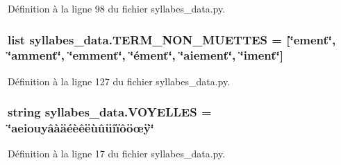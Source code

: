 Définition à la ligne 98 du fichier syllabes\+\_\+data.\+py.

\hypertarget{namespacesyllabes__data_a0f5eea94775ebc51b2af4d9be6cbd1c7}{}
\subsubsection[{T\+E\+R\+M\+\_\+\+N\+O\+N\+\_\+\+M\+U\+E\+T\+T\+E\+S}]{\setlength{\rightskip}{0pt plus 5cm}list syllabes\+\_\+data.\+T\+E\+R\+M\+\_\+\+N\+O\+N\+\_\+\+M\+U\+E\+T\+T\+E\+S = \mbox{[}\char`\"{}ement\char`\"{}, \char`\"{}amment\char`\"{}, \char`\"{}emment\char`\"{}, \char`\"{}ément\char`\"{}, \char`\"{}aiement\char`\"{}, \char`\"{}iment\char`\"{}\mbox{]}}\label{namespacesyllabes__data_a0f5eea94775ebc51b2af4d9be6cbd1c7}


Définition à la ligne 127 du fichier syllabes\+\_\+data.\+py.

\hypertarget{namespacesyllabes__data_a45d6f7f31ae2938971bb79a293ded927}{}
\subsubsection[{V\+O\+Y\+E\+L\+L\+E\+S}]{\setlength{\rightskip}{0pt plus 5cm}string syllabes\+\_\+data.\+V\+O\+Y\+E\+L\+L\+E\+S = \char`\"{}aeiouyâàäéèêëùûüîïôöœÿ\char`\"{}}\label{namespacesyllabes__data_a45d6f7f31ae2938971bb79a293ded927}


Définition à la ligne 17 du fichier syllabes\+\_\+data.\+py.

